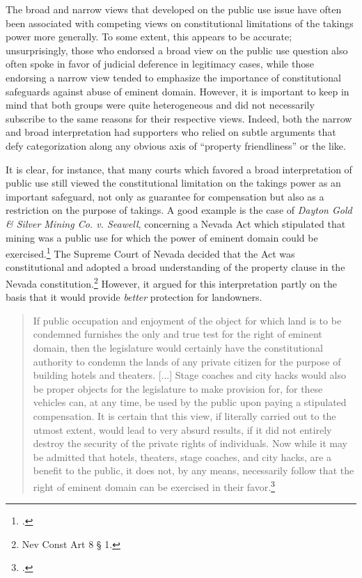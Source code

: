 The broad and narrow views that developed on the public use issue have often been associated with competing views on constitutional limitations of the takings power more generally. To some extent, this appears to be accurate; unsurprisingly, those who endorsed a broad view on the public use question also often spoke in favor of judicial deference in legitimacy cases, while those endorsing a narrow view tended to emphasize the importance of constitutional safeguards against abuse of eminent domain. However, it is important to keep in mind that both groups were quite heterogeneous and did not necessarily subscribe to the same reasons for their respective views. Indeed, both the narrow and broad interpretation had supporters who relied on subtle arguments that defy categorization along any obvious axis of ``property friendliness'' or the like.

It is clear, for instance, that many courts which favored a broad interpretation of public use still viewed the constitutional limitation on the takings power as an important safeguard, not only as guarantee for compensation but also as a restriction on the purpose of  takings. A good example is the case of {\it Dayton Gold \& Silver Mining Co. v. Seawell}, concerning a Nevada Act which stipulated that mining was a public use for which the power of eminent domain could be exercised.\footcite{seawell76} The Supreme Court of Nevada decided that the Act was constitutional and adopted a broad understanding of the property clause in the Nevada constitution.\footnote{Nev Const Art 8 § 1.} However, it argued for this interpretation partly on the basis that it would provide {\it better} protection for landowners.

\begin{quote}
If public occupation and enjoyment of the object for which land is to be condemned furnishes the only and true test for the right of eminent domain, then the legislature would certainly have the constitutional authority to condemn the lands of any private citizen for the purpose of building hotels and theaters. [...] Stage coaches and city hacks would also be proper objects for the legislature to make provision for, for these vehicles can, at any time, be used by the public upon paying a stipulated compensation. It is certain that this view, if literally carried out to the utmost extent, would lead to very absurd results, if it did not entirely destroy the security of the private rights of individuals. Now while it may be admitted that hotels, theaters, stage coaches, and city hacks, are a benefit to the public, it does not, by any means, necessarily follow that the right of eminent domain can be exercised in their favor.\footcite[398-399]{seawell76}
\end{quote}

